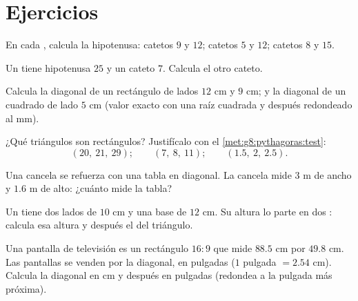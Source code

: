 \section{Ejercicios}

\begin{exercise}[$\star$]\label{exo:g8:pythagoras:1}
En cada , calcula la hipotenusa:
catetos $9$ y $12$; \quad catetos $5$ y $12$; \quad catetos $8$ y $15$.
\end{exercise}

\begin{exercise}[$\star$]\label{exo:g8:pythagoras:2}
Un  tiene hipotenusa $25$ y un cateto $7$. Calcula el
otro cateto.
\end{exercise}

\begin{exercise}[$\star$]\label{exo:g8:pythagoras:3}
Calcula la diagonal de un rectángulo de lados $12$ cm y $9$ cm; y la
diagonal de un cuadrado de lado $5$ cm (valor exacto con una raíz cuadrada
y después redondeado al mm).
\end{exercise}

\begin{exercise}[$\star$]\label{exo:g8:pythagoras:4}
¿Qué triángulos son rectángulos? Justifícalo con el
\cref{met:g8:pythagoras:test}:
\[
(20,\ 21,\ 29); \qquad
(7,\ 8,\ 11); \qquad
(1.5,\ 2,\ 2.5).
\]
\end{exercise}

\begin{exercise}[$\star$]\label{exo:g8:pythagoras:5}
Una cancela se refuerza con una tabla en diagonal. La cancela mide $3$ m de ancho y
$1.6$ m de alto: ¿cuánto mide la tabla?
\end{exercise}

\begin{exercise}[$\star$]\label{exo:g8:pythagoras:6}
Un  tiene dos lados de $10$ cm y una base de $12$ cm.
Su altura lo parte en dos : calcula esa altura
y después el  del triángulo.
\end{exercise}

\begin{exercise}[$\star\star$]\label{exo:g8:pythagoras:7}
Una pantalla de televisión es un rectángulo $16{:}9$ que mide $88.5$ cm por
$49.8$ cm. Las pantallas se venden por la diagonal, en pulgadas
($1$ pulgada $= 2.54$ cm). Calcula la diagonal en cm y después en pulgadas
(redondea a la pulgada más próxima).
\end{exercise}

